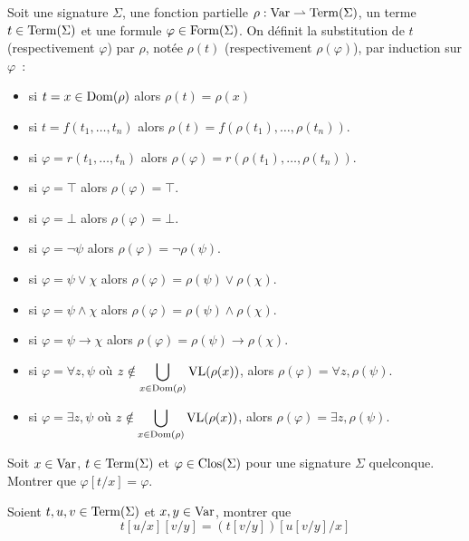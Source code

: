 \begin{definition}
    Soit une signature $\Sigma$, une fonction partielle
    $\rho : \operatorname{Var} \rightharpoonup \operatorname{Term}(\Sigma)$, un terme $t \in \operatorname{Term}(\Sigma)$ et 
    une formule $\varphi \in \operatorname{Form}(\Sigma)$. On définit la substitution de $t$
    (respectivement $\varphi$) par $\rho$, notée  $\rho(t)$
    (respectivement $\rho(\varphi)$), par induction sur $\varphi$~:
    \begin{itemize}
        \item si $t = x \in \operatorname{Dom}(\rho)$ alors $\rho(t) = \rho(x)$
        \item si $t = f(t_1,\ldots,t_n)$ alors
        $\rho(t) = f(\rho(t_1),\ldots,\rho(t_n))$.
        \item si $\varphi = r(t_1,\ldots,t_n)$ alors
        $\rho(\varphi) = r(\rho(t_1),\ldots,\rho(t_n))$.
        \item si $\varphi = \top$ alors $\rho(\varphi) = \top$.
        \item si $\varphi = \bot$ alors $\rho(\varphi) = \bot$.
        \item si $\varphi = \lnot \psi$ alors
        $\rho(\varphi) = \lnot \rho(\psi)$.
        \item si $\varphi = \psi \lor \chi$ alors
        $\rho(\varphi) = \rho(\psi)\lor\rho(\chi)$.
        \item si $\varphi = \psi \land \chi$ alors
        $\rho(\varphi) = \rho(\psi)\land\rho(\chi)$.
        \item si $\varphi = \psi \to \chi$ alors
        $\rho(\varphi) = \rho(\psi)\to\rho(\chi)$.
        \item si $\varphi = \forall z, \psi$ où
        $\displaystyle z \notin \bigcup_{x \in \operatorname{Dom}(\rho)}\operatorname{VL}(\rho(x))$,
        alors $\rho(\varphi) = \forall z, \rho(\psi)$.
        \item si $\varphi = \exists z, \psi$ où
        $\displaystyle z \notin \bigcup_{x \in \operatorname{Dom}(\rho)}\operatorname{VL}(\rho(x))$,
        alors $\rho(\varphi) = \exists z, \rho(\psi)$.
    \end{itemize}
\end{definition}

\begin{exercise}
  Soit $x\in \operatorname{Var}$, $t\in\operatorname{Term}(\Sigma)$ et $\varphi\in\operatorname{Clos}(\Sigma)$ pour une
  signature $\Sigma$ quelconque. Montrer que $\varphi[t/x] = \varphi$.
\end{exercise}

\begin{exercise}
  Soient $t,u,v\in\operatorname{Term}(\Sigma)$ et $x,y\in\operatorname{Var}$, montrer que
  \[t[u/x][v/y] = (t[v/y])[u[v/y]/x]\]
\end{exercise}

